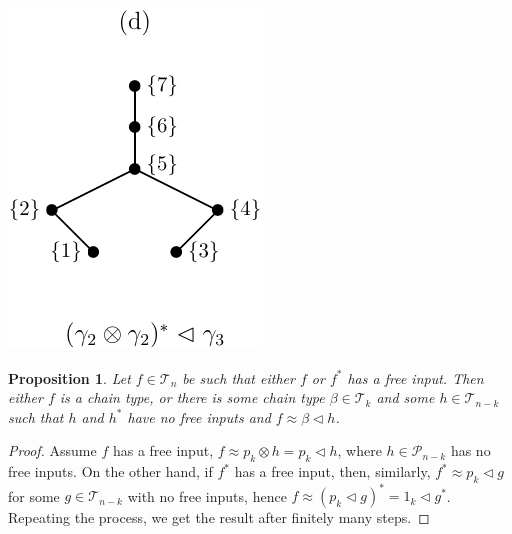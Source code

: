 \documentclass[12pt]{article}
\newtheorem{prop}{Proposition}
\theoremstyle{definition}
\theoremstyle{remark}
\def\Te{\mathcal T}
\def\Pe{\mathcal P}
\def\vtl{\vartriangleleft}
\begin{document}
\begin{center}
\begin{minipage}[c]{0.2\textwidth}
\end{minipage}
\begin{minipage}[c]{0.2\textwidth}
\centering
\includegraphics[scale=0.7]{fri_d.pdf}
\end{minipage}
\end{center}



\begin{prop}\label{prop:pf0_smallest} Let $f\in \Te_n$ be such that either $f$ or
$f^*$ has a free input. 
Then either $f$ is a chain type, or there is some chain type $\beta\in
\Te_k$ and some $h\in \Te_{n-k}$ such that $h$ and $h^*$ have no free inputs and
$f\approx \beta\vtl
h$. 

\end{prop}


\begin{proof} Assume $f$ has a free input, $f\approx p_k\otimes
h=p_k\vtl h$,
where  $h\in \Pe_{n-k}$ has no free inputs. On the other hand, if $f^*$ has a
free input, then, similarly, $f^*\approx p_k\vtl g$ for some $g\in \Te_{n-k}$ with no free
inputs, hence $f\approx (p_k\vtl g)^*=1_k\vtl g^*$. Repeating the process, we get the result
after finitely many steps.


\end{proof}
\end{document}
